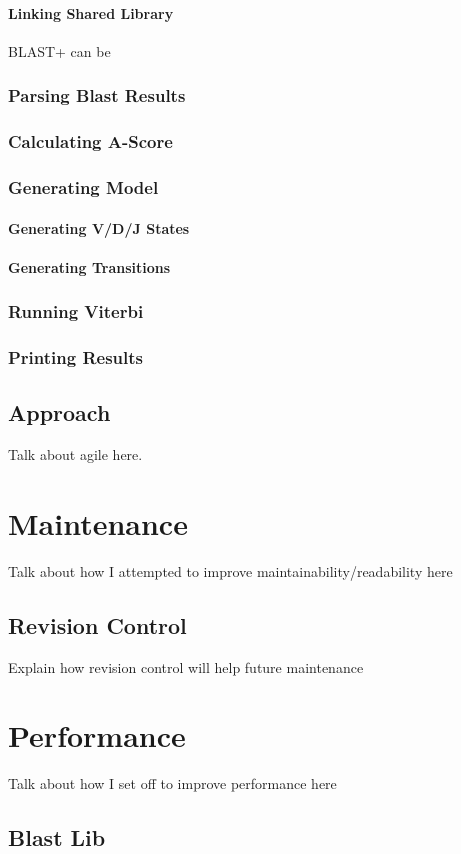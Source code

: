 \subsubsection{Linking Shared Library}
BLAST+ can be 

\subsection{Parsing Blast Results}
\subsection{Calculating A-Score}
\subsection{Generating Model}
\subsubsection{Generating V/D/J States}
\subsubsection{Generating Transitions}
\subsection{Running Viterbi}
\subsection{Printing Results}


\section{Approach}
Talk about agile here.

\chapter{Maintenance}
Talk about how I attempted to improve maintainability/readability here

\section{Revision Control}
Explain how revision control will help future maintenance 

\chapter{Performance}
Talk about how I set off to improve performance here

\section{Blast Lib}
